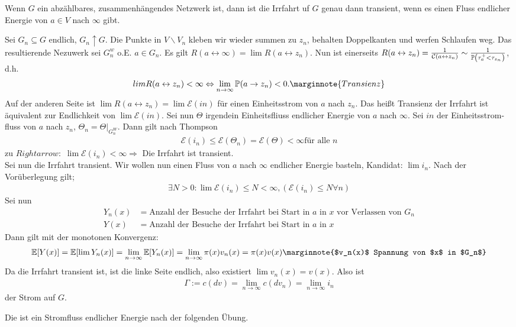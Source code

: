 \begin{satz}[Lyans]
	Wenn $G$ ein abzählbares, zusammenhängendes Netzwerk ist, dann ist die Irrfahrt uf $G$ genau dann transient, wenn es einen Fluss endlicher Energie von $a \in V$ nach $\infty$ gibt.
\end{satz}
\begin{beweis}
	Sei $G_n  \subseteq G$ endlich, $G_n \uparrow G$. Die Punkte in $V \backslash V_n$ kleben wir wieder summen zu $z_n$, behalten Doppelkanten und werfen Schlaufen weg. Das resultierende Nezuwerk sei $G^w_n$ o.E. $a \in G_n$. Es gilt $R(a \leftrightarrow \infty) = \lim R(a \leftrightarrow z_n)$.
	Nun ist einerseits $R(a \leftrightarrow z_n) = \frac{1}{\weight{a \leftrightarrow z_n}} \sim \frac{1}{\prop{\tau^+_a < \tau_{z_n}}}$, d.h. 
	\begin{equation}
		lim R(a \leftrightarrow z_n) < \infty \Leftrightarrow \lim\limits_{n \to \infty} \prop{a \to z_n} < 0. \marginnote{Transienz}
	\end{equation}
	Auf der anderen Seite ist $\lim R(a \leftrightarrow z_n) = \lim \mathcal{E}(in)$ für einen Einheitsstrom von $a$ nach $z_n$. Das heißt Transienz der Irrfahrt ist äquivalent zur Endlichkeit von $\lim \mathcal{E}(in)$. Sei nun $\Theta$ irgendein Einheitsfliuss endlicher Energie von $a$ nach $\infty$. Sei $in$ der Einheitsstrom-fluss von $a$ nach $z_n$, $\Theta_n = \Theta|_{G^W_n}$. Dann gilt nach Thompson 
	\begin{align}
		\mathcal{E}(i_n) \leq \mathcal{E}(\Theta_n) = \mathcal{E}(\Theta) < \infty \text{für alle } n
	\end{align}
	zu $Rightarrow:$ $\lim \mathcal{E}(i_n) < \infty \Rightarrow$ Die Irrfahrt ist transient. \\
	
	Sei nun die Irrfahrt transient. Wir wollen nun einen Fluss von $a$ nach $\infty$ endlicher Energie basteln, Kandidat: $\lim i_n.$ Nach der Vorüberlegung gilt;
	\begin{align}
		\exists N > 0: \lim \mathcal{E}(i_n) \leq N < \infty, (\mathcal{E}(i_n)\leq N \forall n)
	\end{align}
	Sei nun 
	\begin{align}
		Y_n(x) &= \text{Anzahl der Besuche der Irrfahrt bei Start in $a$ in $x$ vor Verlassen von } G_n \\
		Y(x) &= \text{Anzahl der Besuche der Irrfahrt bei Start in $a$ in $x$} 
	\end{align}
	Dann gilt mit der monotonen Konvergenz:
	\begin{align}
		\EWE{Y(x)} = \EWE{\lim Y_n(x)} = \lim\limits_{n \to \infty} \EWE{Y_n(x)} = \lim\limits_{n \to \infty} \pi(x) v_n(x) = \pi(x)v(x) \marginnote{$v_n(x)$ Spannung von $x$ in $G_n$}
	\end{align}
	Da die Irrfahrt transient ist, ist die linke Seite endlich, also existiert $\lim v_n(x) = v(x)$. Also ist
	\begin{align}
		\Gamma := c (dv) = \lim\limits_{n\to\infty} c (dv_n) = \lim\limits_{n\to\infty} i_n
	\end{align}
	der Strom auf $G$.

	Die ist ein Stromfluss endlicher Energie nach der folgenden Übung.
\end{beweis}

